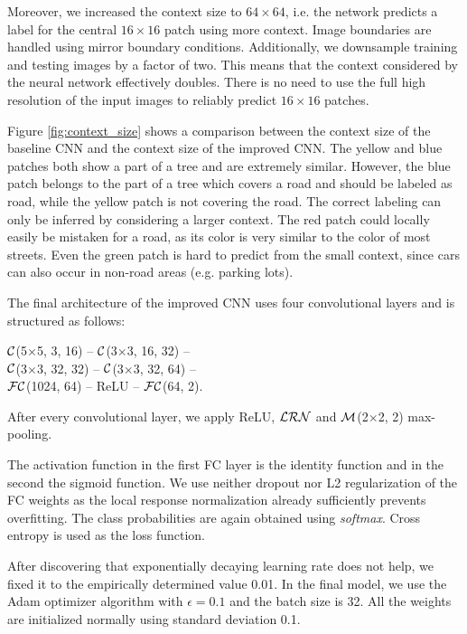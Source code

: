 \documentclass[10pt,conference,compsocconf]{IEEEtran}
\newcommand{\conv}[3]{$ \cal{C} $(#1$ \times  $#1, #2, #3)}
\newcommand{\maxpool}[2]{$ \cal{M} $(#1$ \times $#1, #2)}
\newcommand{\lrn}{$ \cal{LRN}~$}
\newcommand{\fc}[2]{$ \cal{FC} $(#1, #2)}
\begin{document}
Moreover, we increased the context size to $ 64\times64 $, i.e. the network predicts a label for the central $ 16\times16 $ patch using more context. Image boundaries are handled using mirror boundary conditions. Additionally, we downsample training and testing images by a factor of two. This means that the context considered by the neural network effectively doubles. There is no need to use the full high resolution of the input images to reliably predict $ 16 \times 16 $ patches.

\par
Figure \ref{fig:context_size} shows a comparison between the context size of the baseline CNN and the context size of the improved CNN. The yellow and blue patches both show a part of a tree and are extremely similar. However, the blue patch belongs to the part of a tree which covers a road and should be labeled as road, while the yellow patch is not covering the road. The correct labeling can only be inferred by considering a larger context. The red patch could locally easily be mistaken for a road, as its color is very similar to the color of most streets. Even the green patch is hard to predict from the small context, since cars can also occur in non-road areas (e.g. parking lots).

\par
The final architecture of the improved CNN uses four convolutional layers and is structured as follows:
\begin{center}
	\conv{5}{3}{16} -- \conv{3}{16}{32} -- \\ 
	\conv{3}{32}{32} -- \conv{3}{32}{64} -- \\
	\fc{1024}{64} -- ReLU -- \fc{64}{2}.
\end{center}
After every convolutional layer, we apply ReLU, \lrn and \maxpool{2}{2} max-pooling.

The activation function in the first FC layer is the identity function and in the second the sigmoid function. We use neither dropout nor L2 regularization of the FC weights as the local response normalization already sufficiently prevents overfitting. The class probabilities are again obtained using \textit{softmax}. Cross entropy is used as the loss function.

After discovering that exponentially decaying learning rate does not help, we fixed it to the empirically determined value 0.01. 
In the final model, we use the Adam optimizer algorithm \cite{Adam.2014} with $ \epsilon = 0.1 $ and the batch size is 32. All the weights are initialized normally using standard deviation 0.1.
\end{document}
